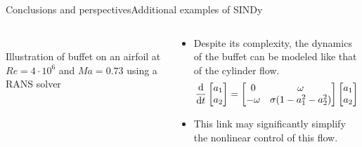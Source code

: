 \documentclass[usenames,dvipsnames,svgnames,10pt,aspectratio=169]{beamer}
\begin{document}
\begin{frame}[t, c]{Conclusions and perspectives}{Additional examples of SINDy}
	\begin{columns}
		\begin{column}{.45\textwidth}
			\centering
			 \\

			{\small Illustration of buffet on an airfoil at $Re=4 \cdot 10^6$ and $Ma=0.73$ using a RANS solver}
			\vspace{.25cm}
		\end{column}
		\begin{column}{.55\textwidth}
			\begin{itemize}
				\item Despite its complexity, the dynamics of the buffet can be modeled like that of the cylinder flow.
				\medskip
				\begin{equation}
					\displaystyle \frac{\mathrm{d}}{\mathrm{d}t} \begin{bmatrix} a_1 \\ a_2 \end{bmatrix}
					=
					\begin{bmatrix}
						0 & \omega \\
						-\omega & \sigma(1 - a_1^2 - a_2^2)
					\end{bmatrix}
					\begin{bmatrix} a_1 \\ a_2 \end{bmatrix}
					\notag
				\end{equation}
				\medskip
				\item This link may significantly simplify the nonlinear control of this flow.
			\end{itemize}
			\vspace{1cm}
		\end{column}
	\end{columns}
\end{frame}
\end{document}
